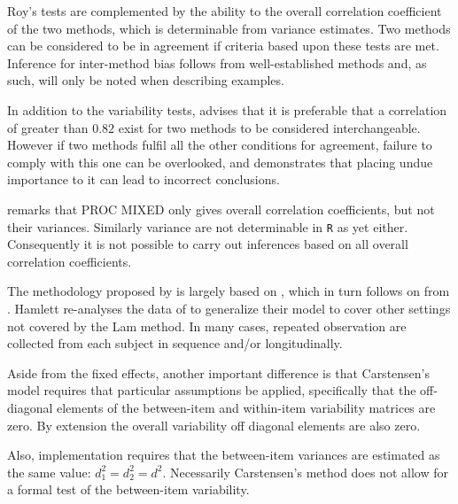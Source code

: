 \documentclass[12pt, a4paper]{report}
\theoremstyle{plain}
\theoremstyle{definition}
\theoremstyle{remark}
\begin{document}
Roy's tests are complemented by the ability to the overall correlation coefficient of the two methods, which is determinable from variance estimates. Two methods can be considered to be in agreement if criteria based upon these tests are met. Inference for inter-method bias follows from well-established methods and, as such, will only be noted when describing examples.
	
	
In addition to the variability tests, \citet{ARoy2009} advises that it is preferable that a correlation of greater than $0.82$ exist for two methods to be considered interchangeable. However if two methods fulfil all the other conditions for agreement, failure to comply with this one can be overlooked, and demonstrates that placing undue importance to it can lead to incorrect conclusions.
	
\citet{ARoy2009} remarks that PROC MIXED only gives overall correlation coefficients, but not their variances. Similarly variance are not determinable in \texttt{R} as yet either. Consequently it is not possible to carry out inferences based on all overall correlation coefficients.
	
	
	
	


The methodology proposed by \citet{ARoy2009} is largely based on \citet{hamlett}, which in turn follows on from \citet{lam}. Hamlett re-analyses the data of \citet{lam} to generalize their model to cover other settings not covered by the Lam method. In many cases, repeated observation are collected from each subject in sequence  and/or longitudinally.





Aside from the fixed effects, another important difference is that Carstensen's model requires that particular assumptions be applied, specifically that the off-diagonal elements of the between-item
and within-item variability matrices are zero. By extension the
overall variability off diagonal elements are also zero.




Also, implementation requires that the between-item variances are
estimated as the same value: $d^2_1 = d^2_2 = d^2$. Necessarily
Carstensen's method does not allow for a formal test of the
between-item variability.
\end{document}
